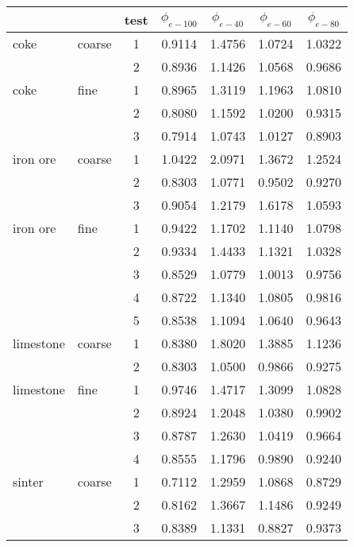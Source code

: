 \begin{table}[h]
\centering
\begin{tabular}{ll|c|cccc}
\hline
          &       & test  & $\phi_{e-100}$ & $\phi_{e-40}$ & $\phi_{e-60}$ &
          $\phi_{e-80}$ \\
\hline          
    coke  & coarse & 1     & 0.9114 & 1.4756 & 1.0724 & 1.0322 \\
          &       & 2     & 0.8936 & 1.1426 & 1.0568 & 0.9686 \\
\hline     
    coke  & fine  & 1     & 0.8965 & 1.3119 & 1.1963 & 1.0810 \\
          &       & 2     & 0.8080 & 1.1592 & 1.0200 & 0.9315 \\
          &       & 3     & 0.7914 & 1.0743 & 1.0127 & 0.8903 \\
\hline 
    iron ore & coarse & 1     & 1.0422 & 2.0971 & 1.3672 & 1.2524 \\
          &       & 2     & 0.8303 & 1.0771 & 0.9502 & 0.9270 \\
          &       & 3     & 0.9054 & 1.2179 & 1.6178 & 1.0593 \\
\hline 
    iron ore & fine  & 1     & 0.9422 & 1.1702 & 1.1140 & 1.0798 \\
          &       & 2     & 0.9334 & 1.4433 & 1.1321 & 1.0328 \\
          &       & 3     & 0.8529 & 1.0779 & 1.0013 & 0.9756 \\
          &       & 4     & 0.8722 & 1.1340 & 1.0805 & 0.9816 \\
          &       & 5     & 0.8538 & 1.1094 & 1.0640 & 0.9643 \\
\hline 
    limestone & coarse & 1     & 0.8380 & 1.8020 & 1.3885 & 1.1236 \\
          &       & 2     & 0.8303 & 1.0500 & 0.9866 & 0.9275 \\
\hline 
    limestone & fine  & 1     & 0.9746 & 1.4717 & 1.3099 & 1.0828 \\
          &       & 2     & 0.8924 & 1.2048 & 1.0380 & 0.9902 \\
          &       & 3     & 0.8787 & 1.2630 & 1.0419 & 0.9664 \\
          &       & 4     & 0.8555 & 1.1796 & 0.9890 & 0.9240 \\
\hline 
    sinter & coarse & 1     & 0.7112 & 1.2959 & 1.0868 & 0.8729 \\
          &       & 2     & 0.8162 & 1.3667 & 1.1486 & 0.9249 \\
          &       & 3     & 0.8389 & 1.1331 & 0.8827 & 0.9373 \\

\end{tabular}
\end{table}
